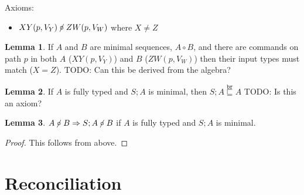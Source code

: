 \documentclass[12pt]{article}
\newcommand{\empt}{\bot}
\newcommand{\pp}{p^\uparrow} %
\newcommand{\fscommand}[2]{{#1#2}}
\newcommand{\fsregcommandchar}[1]{\mathtt{#1}}
\newcommand{\fsregcommand}[2]{\fscommand{\fsregcommandchar{#1}}{\fsregcommandchar{#2}}}
\newcommand{\cbf}{\fsregcommand{\empt}{F}}
\newcommand{\cbd}{\fsregcommand{\empt}{D}}
\newcommand{\cfb}{\fsregcommand{F}{\empt}}
\newcommand{\cfd}{\fsregcommand{F}{D}}
\newcommand{\cdb}{\fsregcommand{D}{\empt}}
\newcommand{\cdf}{\fsregcommand{D}{F}}
\newcommand{\cxy}{\fscommand{X}{Y}}
\newcommand{\czw}{\fscommand{Z}{W}}
\newcommand{\wrext}{\stackrel{\mathtt{br}}{\sqsubseteq}}
\newcommand{\coworks}{\circ}
\newcommand{\ncoworks}{\centernot\circ}
\theoremstyle{definition}
\newtheorem{mylem}{Lemma}
\begin{document}
Axioms:

\begin{itemize}
\item $\cxy(p,V_Y)\ncoworks \czw(p,V_W)$ where $X\neq Z$
\end{itemize}

\begin{mylem}
If $A$ and $B$ are minimal sequences, $A\coworks B$,
and there are commands on path $p$ in both $A$ ($\cxy(p, V_Y)$) and $B$ ($\czw(p, V_W)$)
then their input types must match ($X=Z$).
TODO: Can this be derived from the algebra?
\end{mylem}

\begin{mylem}
If $A$ is fully typed and $S;A$ is minimal, then $S;A\wrext A$
TODO: Is this an axiom?
\end{mylem}

\begin{mylem}\label{lemma:ncowprefix}
$A\ncoworks B \Rightarrow S;A\ncoworks B$ if $A$ is fully typed and $S;A$ is minimal.
\end{mylem}
\begin{proof}
This follows from above.
\end{proof}

\section{Reconciliation}
\end{document}
